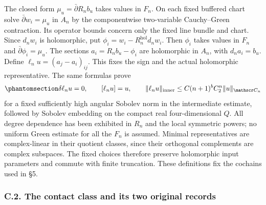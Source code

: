 \documentclass[
  english,
  11pt,
  reqno]{amsart}
\begin{document}
The closed form \(\mu_u=\bar\partial R_nb_u\) takes values in \(F_n\).
On each fixed buffered chart solve \(\bar\partial w_i=\mu_u\) in \(A_n\)
by the componentwise two-variable Cauchy--Green contraction. Its
operator bounds concern only the fixed line bundle and chart. Since
\(d_nw_i\) is holomorphic, put \(\phi_i=w_i-R_n^{\mathrm{hol}}d_nw_i\).
Then \(\phi_i\) takes values in \(F_n\) and
\(\bar\partial\phi_i=\mu_u\). The sections \(a_i=R_nb_u-\phi_i\) are
holomorphic in \(A_n\), with \(d_na_i=b_u\). Define
\(\ell_nu=(a_j-a_i)_{ij}\). This fixes the sign and the actual
holomorphic representative. The same formulas prove
\begin{equation}\protect\phantomsection\label{eq:gg-contact-fixed-class-lift-bound}{
 \delta\ell_nu=0,\qquad [\ell_nu]=u,\qquad
 \|\ell_nu\|_{\mathrm{inner}}
          \le C(n+1)^bC_2^n\|u\|_{\mathscr C_n}
}\end{equation} for a fixed sufficiently high angular Sobolev norm in
the intermediate estimate, followed by Sobolev embedding on the compact
real four-dimensional \(Q\). All degree dependence has been exhibited in
\(R_n\) and the local symmetric powers; no uniform Green estimate for
all the \(F_n\) is assumed. Minimal representatives are complex-linear
in their quotient classes, since their orthogonal complements are
complex subspaces. The fixed choices therefore preserve holomorphic
input parameters and commute with finite truncation. These definitions
fix the cochains used in §5.

\protect{}\label{sec:gg-contact-conformal-identification}

\subsubsection{C.2. The contact class and its two original
records}\label{c.2.-the-contact-class-and-its-two-original-records}
\end{document}
